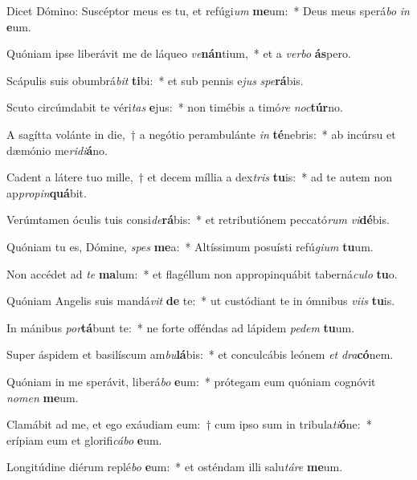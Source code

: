 \item Dicet Dómino: Suscéptor meus es tu, et refúgi\textit{um} \textbf{me}um:~* Deus meus sperá\textit{bo} \textit{in} \textbf{e}um.
\item Quóniam ipse liberávit me de láqueo \textit{ve}\textbf{nán}tium,~* et a \textit{ver}\textit{bo} \textbf{ás}pero.
\item Scápulis suis obumbrá\textit{bit} \textbf{ti}bi:~* et sub pennis e\textit{jus} \textit{spe}\textbf{rá}bis.
\item Scuto circúmdabit te véri\textit{tas} \textbf{e}jus:~* non timébis a timó\textit{re} \textit{noc}\textbf{túr}no.
\item A sagítta volánte in die,~† a negótio perambulánte \textit{in} \textbf{té}nebris:~* ab incúrsu et dæmónio me\textit{ri}\textit{di}\textbf{á}no.
\item Cadent a látere tuo mille,~† et decem míllia a dex\textit{tris} \textbf{tu}is:~* ad te autem non ap\textit{pro}\textit{pin}\textbf{quá}bit.
\item Verúmtamen óculis tuis consi\textit{de}\textbf{rá}bis:~* et retributiónem peccató\textit{rum} \textit{vi}\textbf{dé}bis.
\item Quóniam tu es, Dómine, \textit{spes} \textbf{me}a:~* Altíssimum posuísti refú\textit{gi}\textit{um} \textbf{tu}um.
\item Non accédet ad \textit{te} \textbf{ma}lum:~* et flagéllum non appropinquábit taberná\textit{cu}\textit{lo} \textbf{tu}o.
\item Quóniam Angelis suis mandá\textit{vit} \textbf{de} te:~* ut custódiant te in ómnibus \textit{vi}\textit{is} \textbf{tu}is.
\item In mánibus \textit{por}\textbf{tá}bunt te:~* ne forte offéndas ad lápidem \textit{pe}\textit{dem} \textbf{tu}um.
\item Super áspidem et basilíscum am\textit{bu}\textbf{lá}bis:~* et conculcábis leónem \textit{et} \textit{dra}\textbf{có}nem.
\item Quóniam in me sperávit, liberá\textit{bo} \textbf{e}um:~* prótegam eum quóniam cognóvit \textit{no}\textit{men} \textbf{me}um.
\item Clamábit ad me, et ego exáudiam eum:~† cum ipso sum in tribula\textit{ti}\textbf{ó}ne:~* erípiam eum et glorifi\textit{cá}\textit{bo} \textbf{e}um.
\item Longitúdine diérum replé\textit{bo} \textbf{e}um:~* et osténdam illi salu\textit{tá}\textit{re} \textbf{me}um.
